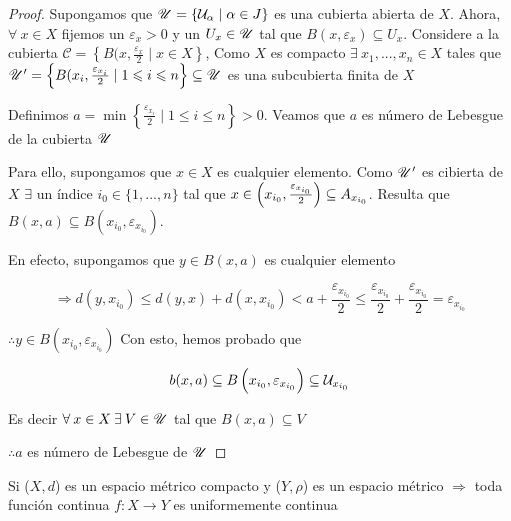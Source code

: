 \begin{proof}
    Supongamos que $\mathscr{U} = \{ \mathcal{U}_\alpha \mid \alpha \in J \}$ es una cubierta abierta de $X$. Ahora, $\forall \: x \in X$ fijemos un $\varepsilon_x > 0$ y un $U_x \in \mathscr{U}$ tal que $B(x,\varepsilon_x) \subseteq U_x$. Considere a la cubierta $\mathscr{C} = \left\{ B(x, \frac{\varepsilon_x}{2} \mid x \in X \right\}$, Como $X$ es compacto $\exists \: x_1, ..., x_n \in X$ tales que $\mathscr{U}^\prime = \left\{ B(x_i, \frac{\varepsilon_{x_i}}{2} \mid 1 \leqslant i \leqslant n \right\} \subseteq \mathscr{U}$ es una subcubierta finita de $X$

    Definimos $a = \min \left\{ \frac{\varepsilon_{x_i}}{2} \mid 1 \leqslant i \leqslant n \right\} > 0$. Veamos que $a$ es número de Lebesgue de la cubierta $\mathscr{U}$

    Para ello, supongamos que $x \in X$ es cualquier elemento. Como $\mathscr{U}^\prime$ es cibierta de $X$ $\exists$ un índice $i_0 \in \{ 1, ..., n \}$ tal que $x \in \left( x_{i_0} , \frac{\varepsilon_{ x_{i_0}}}{2}\right) \subseteq \\A_{x_{i_0}}$. Resulta que $B(x,a) \subseteq B\left( x_{i_0}, \varepsilon_{ x_{i_0}} \right)$.

    En efecto, supongamos que $y \in B(x,a)$ es cualquier elemento

    $$\Rightarrow d(y,  x_{i_0}) \leqslant d(y,x)+ d(x, x_{i_0}) < a + \frac{\varepsilon_{ x_{i_0}}}{2} \leqslant \frac{\varepsilon_{ x_{i_0}}}{2} + \frac{\varepsilon_{ x_{i_0}}}{2} = \varepsilon_{ x_{i_0}}$$

    $\therefore y \in B\left( x_{i_0}, \varepsilon_{ x_{i_0}} \right)$ Con esto, hemos probado que

    $$b(x,a) \subseteq B\left( x_{i_0}, \varepsilon_{ x_{i_0}} \right) \subseteq \mathcal{U}_{x_{i_0}}$$

    Es decir $\forall \: x \in X \: \exists \: V \in \mathscr{U} $ tal que $B(x,a) \subseteq V$

    $\therefore a$ es número de Lebesgue de $\mathscr{U}$
\end{proof}

\begin{theorem} \label{theom3531}
    Si ($X,d$) es un espacio métrico compacto y ($Y,\rho$) es un espacio métrico $\Rightarrow$ toda función continua $f : X \to Y$ es uniformemente continua
\end{theorem}

